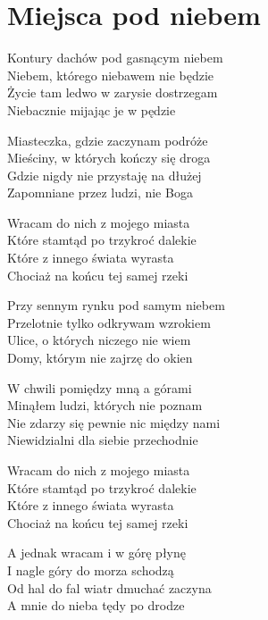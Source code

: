 \section{Miejsca pod niebem}
\begin{text}
    \vfill\linebreak[2]
    Kontury dachów pod gasnącym niebem\\
    Niebem, którego niebawem nie będzie\\
    Życie tam ledwo w zarysie dostrzegam\\
    Niebacznie mijając je w pędzie

    Miasteczka, gdzie zaczynam podróże\\
    Mieściny, w których kończy się droga\\
    Gdzie nigdy nie przystaję na dłużej\\
    Zapomniane przez ludzi, nie Boga

    \vin Wracam do nich z mojego miasta\\
    \vin Które stamtąd po trzykroć dalekie\\
    \vin Które z innego świata wyrasta\\
    \vin Chociaż na końcu tej samej rzeki

    Przy sennym rynku pod samym niebem\\
    Przelotnie tylko odkrywam wzrokiem\\
    Ulice, o których niczego nie wiem\\
    Domy, którym nie zajrzę do okien

    W chwili pomiędzy mną a górami\\
    Minąłem ludzi, których nie poznam\\
    Nie zdarzy się pewnie nic między nami\\
    Niewidzialni dla siebie przechodnie

    \vin Wracam do nich z mojego miasta\\
    \vin Które stamtąd po trzykroć dalekie\\
    \vin Które z innego świata wyrasta\\
    \vin Chociaż na końcu tej samej rzeki

    \vin A jednak wracam i w górę płynę\\
    \vin I nagle góry do morza schodzą\\
    \vin Od hal do fal wiatr dmuchać zaczyna\\
    \vin A mnie do nieba tędy po drodze
\end{text}
